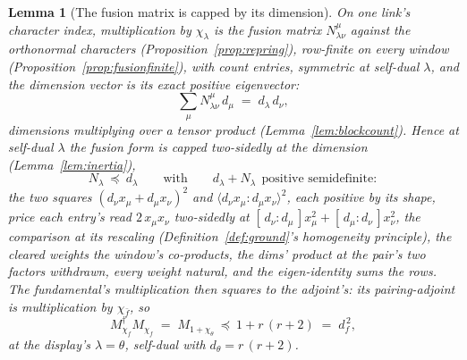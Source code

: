 \documentclass[11pt]{article}
\newtheorem{lemma}{Lemma}
\theoremstyle{definition}
\begin{document}
\begin{lemma}[The fusion matrix is capped by its dimension]\label{lem:fpcap}
On one link's character index, multiplication by $\chi_\lambda$ is the
fusion matrix $N^\mu_{\lambda\nu}$ against the orthonormal characters
(Proposition~\ref{prop:repring}), row-finite on every window
(Proposition~\ref{prop:fusionfinite}), with count entries,
symmetric at self-dual $\lambda$, and the dimension vector is its exact
positive eigenvector:
\[
\sum_\mu N^\mu_{\lambda\nu}\,d_\mu\;=\;d_\lambda\,d_\nu ,
\]
dimensions multiplying over a tensor product (Lemma~\ref{lem:blockcount}).
Hence
at self-dual $\lambda$ the fusion form is capped two-sidedly at the
dimension (Lemma~\ref{lem:inertia}),
\[
N_\lambda\ \preceq\ d_\lambda
\qquad\text{with}\qquad
d_\lambda+N_\lambda\ \ \text{positive semidefinite}:
\]
the two squares $(d_\nu x_\mu+d_\mu x_\nu)^2$ and
$\langle d_\nu x_\mu\!:\!d_\mu x_\nu\rangle^2$, each positive by its
shape, price each entry's read $2\,x_\mu x_\nu$
two-sidedly at
$[\,d_\nu\!:\!d_\mu\,]x_\mu^2+[\,d_\mu\!:\!d_\nu\,]x_\nu^2$, the
comparison at its rescaling (Definition~\ref{def:ground}'s
homogeneity principle), the cleared weights the window's
co-products, the dims' product at the pair's two factors
withdrawn, every weight natural, and the
eigen-identity sums the rows. The fundamental's multiplication then squares to the
adjoint's: its pairing-adjoint is multiplication by $\chi_{\bar f}$, so
\[
M_{\chi_f}^\dagger M_{\chi_f}\;=\;M_{1+\chi_\theta}\ \preceq\
1+r\,(r+2)\;=\;d_f^{\,2} ,
\]
at the display's $\lambda=\theta$, self-dual with $d_\theta=r\,(r+2)$.
\end{lemma}
\end{document}
